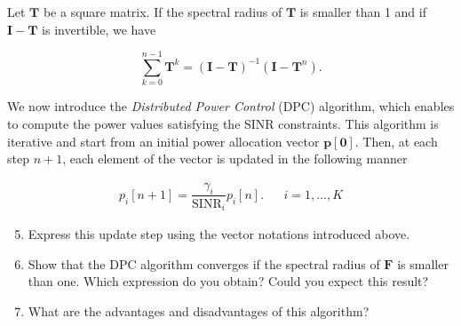 \documentclass [a4paper, 11pt] {article}
\begin{document}
\begin{exercise}{2}
Let $\mathbf{T}$ be a square matrix. If the spectral radius of $\mathbf{T}$ is smaller than 1 and if $\mathbf{I} - \mathbf{T}$ is invertible, we have 

\begin{equation} \sum_{k=0}^{n-1} \mathbf{T}^k = (\mathbf{I} - \mathbf{T})^{-1}(\mathbf{I} - \mathbf{T}^n). \end{equation}


We now introduce the \textit{Distributed Power Control} (DPC) algorithm, which enables to compute the power values satisfying the SINR constraints. This algorithm is iterative and start from an initial power allocation vector $\mathbf{p[0]}$. Then, at each step $n+1$, each element of the vector is updated in the following manner 

\begin{align}
    p_i[n+1] = \dfrac{\gamma_i}{\text{SINR}_i}p_i[n]. && i=1,\hdots,K
\end{align}


\begin{enumerate}
\setcounter{enumi}{4}
\item Express this update step using the vector notations introduced above.
\item Show that the DPC algorithm converges if the spectral radius of $\mathbf{F}$ is smaller than one. Which expression do you obtain? Could you expect this result?
\end{enumerate}

\begin{enumerate}
\setcounter{enumi}{6}
\item What are the advantages and disadvantages of this algorithm?
\end{enumerate}
        
    \end{exercise}
    
\end{document}
